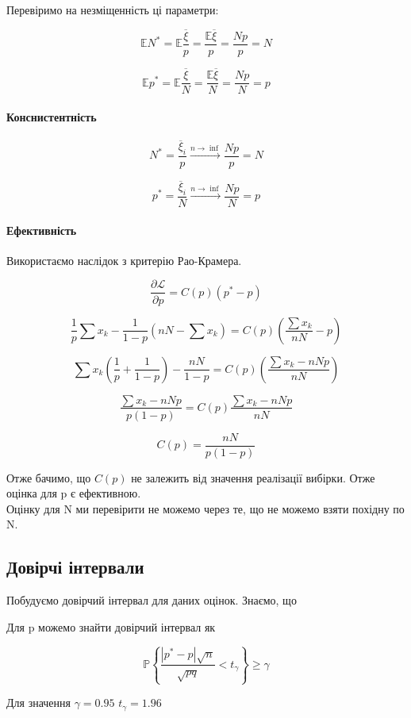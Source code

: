 \documentclass{article}
\begin{document}
Перевіримо на незміщенність ці параметри:

$$
\mathbb{E}N^* =\mathbb{E} \frac{\overline\xi}{p} =\frac{\mathbb{E}\overline\xi}{p} = \frac{Np}{p} =
N
$$

$$
\mathbb{E}p^* =\mathbb{E} \frac{\overline\xi}{N} =\frac{\mathbb{E}\overline\xi}{N} = \frac{Np}{N} =
p
$$
\paragraph{Конснистентність}

$$
N^* = \frac{\overline\xi_i}{p} \xrightarrow{n\rightarrow\inf} \frac{Np}{p} = N
$$


$$
p^* = \frac{\overline\xi_i}{N} \xrightarrow{n\rightarrow\inf} \frac{Np}{N} = p
$$

\paragraph{Ефективність}
Використаємо наслідок з критерію Рао-Крамера. 

$$
\frac{\partial \mathcal{L}}{\partial p} = C(p) (p^* - p)
$$

$$
\frac{1}{p}\sum x_k - \frac{1}{1-p} \left(nN - \sum x_k\right) = C(p) \left(\frac{\sum x_k}{nN} -
p\right)
$$

$$
\sum x_k \left( \frac{1}{p} + \frac{1}{1-p}  \right) - \frac{nN}{1-p} = C(p) \left(\frac{ \sum x_k -
nNp}{nN} \right)
$$

$$
\frac{\sum x_k - nNp}{p(1-p)} = C(p) \frac{\sum x_k - nNp}{nN}
$$

$$
C(p) = \frac{nN}{p(1-p)}
$$

Отже бачимо, що $C(p)$ не залежить від значення реалізації вибірки. Отже оцінка для p є
ефективною.\\

Оцінку для N ми перевірити не можемо через те, що не можемо взяти похідну по N.



\subsection{Довірчі інтервали}
Побудуємо довірчий інтервал для даних оцінок. Знаємо, що

Для p можемо знайти довірчий інтервал як 

$$
\mathbb{P} \left\{\frac{ | p^* - p | \sqrt{n} } {\sqrt{pq}} < t_\gamma \right\} \geq \gamma
$$

Для значення $\gamma=0.95$ $t_\gamma = 1.96$  
\end{document}
